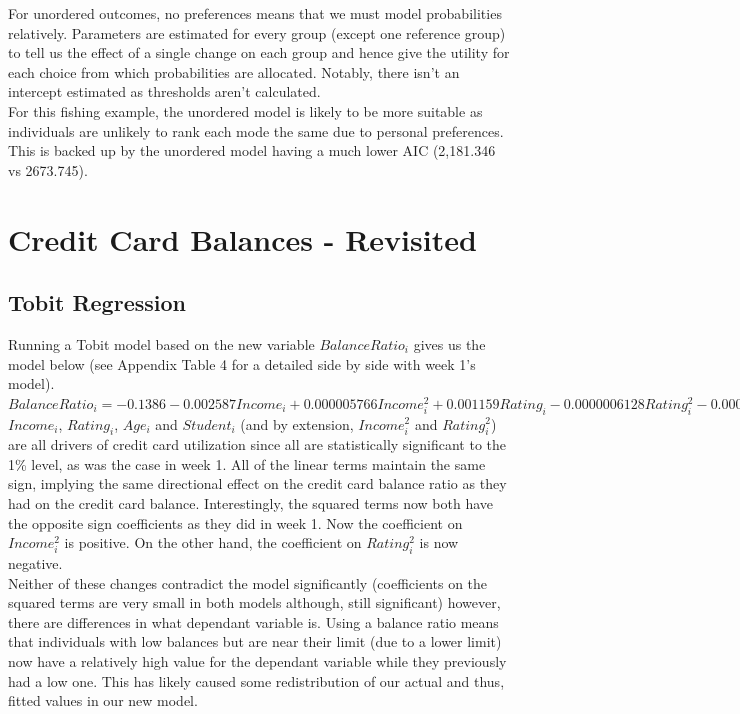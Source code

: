 \documentclass[12pt]{article}
\begin{document}
{For unordered outcomes, no preferences means that we must model probabilities relatively. Parameters are estimated for every group (except one reference group) to tell us the effect of a single change on each group and hence give the utility for each choice from which probabilities are allocated. Notably, there isn't an intercept estimated as thresholds aren't calculated.\\

For this fishing example, the unordered model is likely to be more suitable as individuals are unlikely to rank each mode the same due to personal preferences. This is backed up by the unordered model having a much lower AIC (2,181.346 vs 2673.745).


\section*{Credit Card Balances - Revisited}
\subsection*{Tobit Regression}
Running a Tobit model based on the new variable $BalanceRatio_i$ gives us the model below (see Appendix Table 4 for a detailed side by side with week 1's model).\\

$BalanceRatio_i = -0.1386 -0.002587Income_i + 0.000005766Income^2_i + 0.001159Rating_i - 0.0000006128Rating^2_i - 0.0001993Age_i + 0.1018Student_i$\\

$Income_i$, $Rating_i$, $Age_i$ and $Student_i$ (and by extension, $Income^2_i$ and $Rating^2_i$) are all drivers of credit card utilization since all are statistically significant to the 1\% level, as was the case in week 1. All of the linear terms maintain the same sign, implying the same directional effect on the credit card balance ratio as they had on the credit card balance. Interestingly, the squared terms now both have the opposite sign coefficients as they did in week 1. Now the coefficient on $Income^2_i$ is positive. On the other hand, the coefficient on $Rating^2_i$ is now negative.\\

Neither of these changes contradict the model significantly (coefficients on the squared terms are very small in both models although, still significant) however, there are differences in what dependant variable is. Using a balance ratio means that individuals with low balances but are near their limit (due to a lower limit) now have a relatively high value for the dependant variable while they previously had a low one. This has likely caused some redistribution of our actual and thus, fitted values in our new model.\\

}
\end{document}
